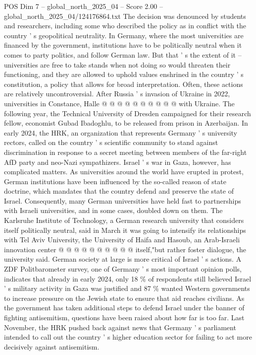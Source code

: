 \begin{textsample}{POS Dim 7 – global\_north\_2025\_04 – Score 2.00 – global\_north\_2025\_04/124176864.txt}
The decision was denounced by students and researchers, including some who described the policy as in conflict with the country ' s geopolitical neutrality.
In Germany, where the most universities are financed by the government, institutions have to be politically neutral when it comes to party politics, and follow German law.
But that ' s the extent of it -- universities are free to take stands when not doing so would threaten their functioning, and they are allowed to uphold values enshrined in the country ' s constitution, a policy that allows for broad interpretation.
Often, these actions are relatively uncontroversial.
After Russia ' s invasion of Ukraine in 2022, universities in Constance, Halle @ @ @ @ @ @ @ @ @ @ with Ukraine.
The following year, the Technical University of Dresden campaigned for their research fellow, economist Gubad Ibadoghlu, to be released from prison in Azerbaijan.
In early 2024, the HRK, an organization that represents Germany ' s university rectors, called on the country ' s scientific community to stand against discrimination in response to a secret meeting between members of the far-right AfD party and neo-Nazi sympathizers.
Israel ' s war in Gaza, however, has complicated matters.
As universities around the world have erupted in protest, German institutions have been influenced by the so-called reason of state doctrine, which mandates that the country defend and preserve the state of Israel.
Consequently, many German universities have held fast to partnerships with Israeli universities, and in some cases, doubled down on them.
The Karlsruhe Institute of Technology, a German research university that considers itself politically neutral, said in March it was going to intensify its relationships with Tel Aviv University, the University of Haifa and Hasoub, an Arab-Israeli innovation center @ @ @ @ @ @ @ @ @ @ itself,"but rather foster dialogue, the university said.
German society at large is more critical of Israel ' s actions.
A ZDF Politbarometer survey, one of Germany ' s most important opinion polls, indicates that already in early 2024, only 18 \% of respondents still believed Israel ' s military activity in Gaza was justified and 87 \% wanted Western governments to increase pressure on the Jewish state to ensure that aid reaches civilians.
As the government has taken additional steps to defend Israel under the banner of fighting antisemitism, questions have been raised about how far is too far.
Last November, the HRK pushed back against news that Germany ' s parliament intended to call out the country ' s higher education sector for failing to act more decisively against antisemitism.

\end{textsample}
